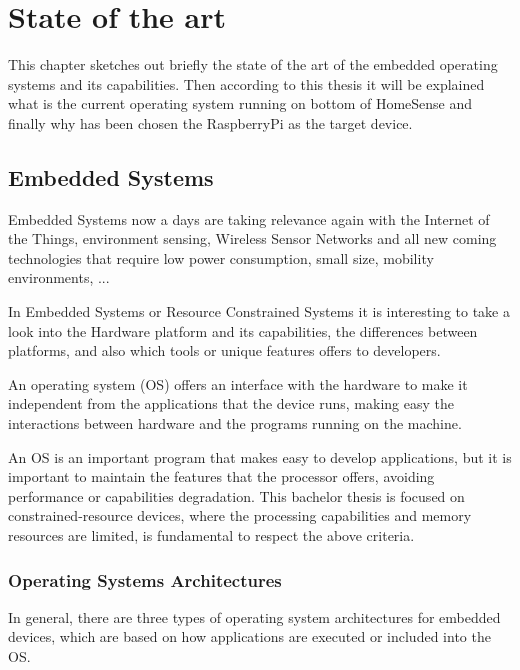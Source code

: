 \chapter{State of the art}\label{C:State-Art}

This chapter sketches out briefly the state of the art of the embedded operating systems and its capabilities. Then according to this thesis it will be explained what is the current operating system running on bottom of HomeSense and finally why has been chosen the RaspberryPi as the target device.

\section{Embedded Systems}\label{S:SOTA-Embedded-Systems}
Embedded Systems now a days are taking relevance again with the Internet of the Things, environment sensing, Wireless Sensor Networks and all new coming technologies that require low power consumption, small size, mobility environments, ...

In Embedded Systems or Resource Constrained Systems it is interesting to take a look into the Hardware platform and its capabilities, the differences between platforms, and also which tools or unique features offers to developers.

An operating system (OS) offers an interface with the hardware to make it independent from the applications that the device runs, making easy the interactions between hardware and the programs running on the machine.

An OS is an important program that makes easy to develop applications, but it is important to maintain the features that the processor offers, avoiding performance or capabilities degradation. 
This bachelor thesis is focused on constrained-resource devices, where the processing capabilities and memory resources are limited, is fundamental to respect the above criteria.

\subsection{Operating Systems Architectures}\label{SOTA-Operating-Systems-Architectures}
In general, there are three types of operating system architectures for embedded devices, which are based on how applications are executed or included into the OS.

